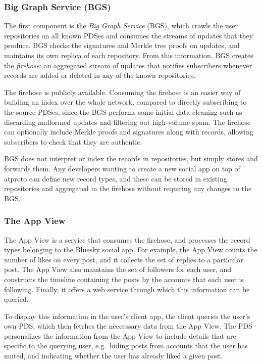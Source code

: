 \documentclass[sigconf,review]{acmart}
\begin{document}
\subsubsection{Big Graph Service (BGS)}\label{sec:bgs}

The first component is the \emph{Big Graph Service} (BGS), which crawls the user repositories on all known PDSes and consumes the streams of updates that they produce.
BGS checks the signatures and Merkle tree proofs on updates, and maintains its own replica of each repository.
From this information, BGS creates the \emph{firehose}: an aggregated stream of updates that notifies subscribers whenever records are added or deleted in any of the known repositories.

The firehose is publicly available.
Consuming the firehose is an easier way of building an index over the whole network, compared to directly subscribing to the source PDSes, since the BGS performs some initial data cleaning such as discarding malformed updates and filtering out high-volume spam.
The firehose can optionally include Merkle proofs and signatures along with records, allowing subscribers to check that they are authentic.

BGS does not interpret or index the records in repositories, but simply stores and forwards them.
Any developers wanting to create a new social app on top of atproto can define new record types, and these can be stored in existing repositories and aggregated in the firehose without requiring any changes to the BGS.

\subsubsection{The App View}\label{sec:appview}

The App View is a service that consumes the firehose, and processes the record types belonging to the Bluesky social app.
For example, the App View counts the number of likes on every post, and it collects the set of replies to a particular post.
The App View also maintains the set of followers for each user, and constructs the timeline containing the posts by the accounts that each user is following.
Finally, it offers a web service through which this information can be queried.

To display this information in the user's client app, the client queries the user's own PDS, which then fetches the neccessary data from the App View.
The PDS personalizes the information from the App View to include details that are specific to the querying user, e.g.\ hiding posts from accounts that the user has muted, and indicating whether the user has already liked a given post.
\end{document}
